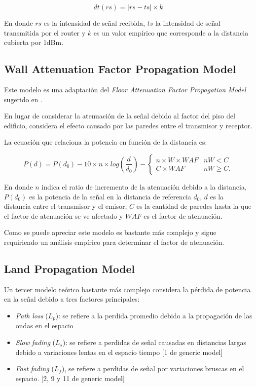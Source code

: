 \documentclass[journal]{IEEEtran}
\begin{document}
$$dt(rs) = |rs - ts| \times k$$

En donde $rs$ es la intensidad de señal recibida, $ts$ la intensidad de señal transmitida por el router y $k$ es un valor empírico que corresponde a la distancia cubierta por 1dBm.\\

\subsection{Wall Attenuation Factor Propagation Model}

Este modelo es una adaptación del \emph{Floor Attenuation Factor Propagation Model} sugerido en \cite{Sei92, de RADAR}.

En lugar de considerar la atenuación de la señal debido al factor del piso del edificio, considera el efecto causado por las paredes entre el transmisor y receptor.

La ecuación que relaciona la potencia en función de la distancia es:

\begin{equation*}
P(d) = P(d_0) - 10 \times n \times log(\frac {d} {d_0}) - \begin{cases}
n \times W \times WAF &nW < C\\
C \times WAF &nW \geq C.
\end{cases}
\end{equation*}

En donde $n$ indica el ratio de incremento de la atenuación debido a la distancia, $P(d_0)$ es la potencia de la señal en la distancia de referencia $d_0$, $d$ es la distancia entre el transmisor y el emisor, $C$ es la cantidad de paredes hasta la que el factor de atenuación se ve afectado y $WAF$ es el factor de atenuación.

Como se puede apreciar este modelo es bastante más complejo y sigue requiriendo un análisis empírico para determinar el factor de atenuación.

\subsection{Land Propagation Model}

Un tercer modelo teórico bastante más complejo considera la pérdida de potencia en la señal debido a tres factores principales:

\begin{itemize}

\item \emph{Path loss} ($L_p$): se refiere a la perdida promedio debido a la propagación de las ondas en el espacio

\item \emph{Slow fading} ($L_s$): se refiere a perdidas de señal causadas en distancias largas debido a variaciones lentas en el espacio tiempo [1 de generic model]

\item \emph{Fast fading} ($L_f$), se refiere a perdidas de señal por variaciones bruscas en el espacio. [2, 9 y 11 de generic model]

\end{itemize}
\end{document}
